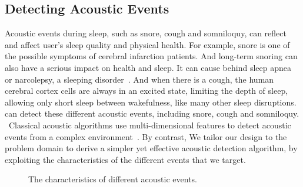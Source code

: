 \subsection{Detecting Acoustic Events \label{sec:acoustic}}
Acoustic events during sleep, such as snore, cough and somniloquy, can reflect and affect user's sleep quality and physical health. For
example, snore is one of the possible symptoms of cerebral infarction patients.  And long-term snoring can also have a serious impact on
health and sleep. It can cause behind sleep apnea or narcolepsy, a sleeping disorder~\cite{snoring2016,snoring2013}. And when there is a
cough, the human cerebral cortex cells are always in an excited state, limiting the depth of sleep, allowing only short sleep between
wakefulness, like many other sleep disruptions. {\systemname} can detect these different acoustic events, including snore, cough and
somniloquy. \ Classical acoustic algorithms use multi-dimensional features to detect acoustic events from a complex
environment~\cite{gu2016sleep}. By contrast, We tailor our design to the problem domain to derive a simpler yet effective acoustic
detection algorithm, by exploiting the characteristics of the different events that we target.

\begin{figure}[!t]
\centering
\caption{The characteristics of different acoustic events.}\label{acoustic}
\end{figure}


